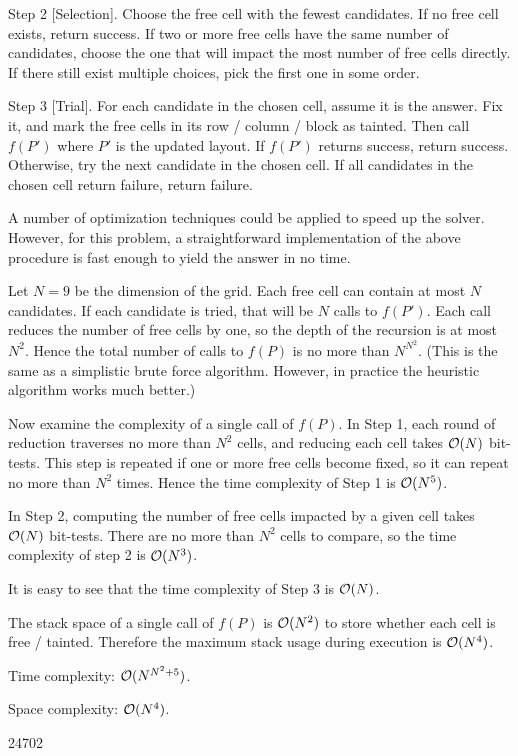 Step 2 [Selection]. Choose the free cell with the fewest candidates. If no free cell exists, return success. If two or more free cells have the same number of candidates, choose the one that will impact the most number of free cells directly. If there still exist multiple choices, pick the first one in some order.

Step 3 [Trial]. For each candidate in the chosen cell, assume it is the answer. Fix it, and mark the free cells in its row / column / block as tainted. Then call $f(P')$ where $P'$ is the updated layout. If $f(P')$ returns success, return success. Otherwise, try the next candidate in the chosen cell. If all candidates in the chosen cell return failure, return failure.

A number of optimization techniques could be applied to speed up the solver. However, for this problem, a straightforward implementation of the above procedure is fast enough to yield the answer in no time.

\complexity

Let $N = 9$ be the dimension of the grid. Each free cell can contain at most $N$ candidates. If each candidate is tried, that will be $N$ calls to $f(P')$. Each call reduces the number of free cells by one, so the depth of the recursion is at most $N^2$. Hence the total number of calls to $f(P)$ is no more than $N^{N^2}$. (This is the same as a simplistic brute force algorithm. However, in practice the heuristic algorithm works much better.)

Now examine the complexity of a single call of $f(P)$. In Step 1, each round of reduction traverses no more than $N^2$ cells, and reducing each cell takes $\mathcal{O}(N)$ bit-tests. This step is repeated if one or more free cells become fixed, so it can repeat no more than $N^2$ times. Hence the time complexity of Step 1 is $\mathcal{O}(N^5)$.

In Step 2, computing the number of free cells impacted by a given cell takes $\mathcal{O}(N)$ bit-tests. There are no more than $N^2$ cells to compare, so the time complexity of step 2 is $\mathcal{O}(N^3)$.

It is easy to see that the time complexity of Step 3 is $\mathcal{O}(N)$.

The stack space of a single call of $f(P)$ is $\mathcal{O}(N^2)$ to store whether each cell is free / tainted. Therefore the maximum stack usage during execution is $\mathcal{O}(N^4)$.

Time complexity: $\mathcal{O}(N^{N^2+5})$.

Space complexity: $\mathcal{O}(N^4)$.

\answer

24702


